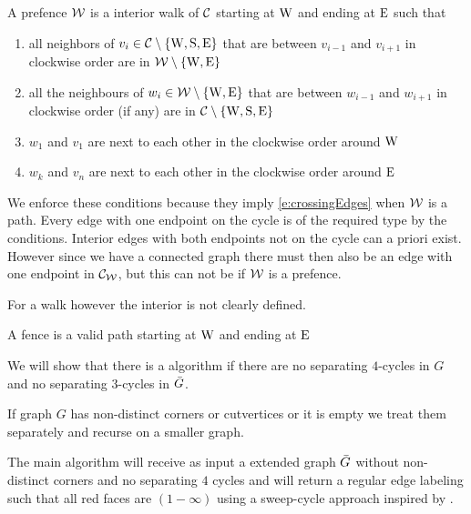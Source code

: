 \begin{defi}[prefence]
A prefence $\mathcal{W}$ is a interior walk of $\mathcal{C}$ starting at $\mathrm{W}$ and ending at $\mathrm{E}$ such that
\begin{enumerate}
 \renewcommand*{\labelenumi}{(P\arabic{enumi})}%
 \renewcommand*{\theenumi}{(P\arabic{enumi})}%
  \item  all neighbors of $v_i \in \mathcal{C} \setminus \left\lbrace {\mathrm{W}, \mathrm{S}, \mathrm{E}} \right\rbrace$ that are between $v_{i-1}$ and $v_{i+1}$ in clockwise order are in $\mathcal{W} \setminus \left\lbrace {\mathrm{W}, \mathrm{E}} \right\rbrace$
  \label{p:C}
  \item all the neighbours of $w_i \in \mathcal{W} \setminus \left\lbrace {\mathrm{W}, \mathrm{E}} \right\rbrace$ that are between $w_{i-1}$ and $w_{i+1}$ in clockwise order (if any) are in $\mathcal{C} \setminus \left\lbrace {\mathrm{W}, \mathrm{S}, \mathrm{E}} \right\rbrace$
  \label{p:W}
  \item $w_1$ and $v_1$ are next to each other in the clockwise order around $\mathrm{W}$
  \label{p:pW}  
  \item $w_k$ and $v_n$ are next to each other in the clockwise order around  $\mathrm{E}$
  \label{p:pE}
\end{enumerate}
\end{defi}


We enforce these conditions because they imply \ref{e:crossingEdges} when $\mathcal{W}$ is a path. Every edge with one endpoint on the cycle is of the required type by the conditions. Interior edges with both endpoints not on the cycle can a priori exist. However since we have a connected graph there must then also be an edge with  one endpoint in $\mathcal{C}_{\mathcal{W}}$, but this can not be if $\mathcal{W}$ is a prefence.

For a walk however the interior is not clearly defined.

\begin{defi}[fence]
A fence is a valid path starting at $\mathrm{W}$ and ending at $\mathrm{E}$
\end{defi}



We will show that there is a algorithm if there are no separating $4$-cycles in $G$ and no separating $3$-cycles in $\bar{G}$.

If graph $G$ has non-distinct corners or cutvertices or it is empty we treat them separately and recurse on a smaller graph. 


The main algorithm will receive as input a extended graph $\bar{G}$ without non-distinct corners and no separating $4$ cycles and will return a regular edge labeling such that all red faces are $(1-\infty)$ using a sweep-cycle approach inspired by \Fusy {} \cite{Fusy2006}.


